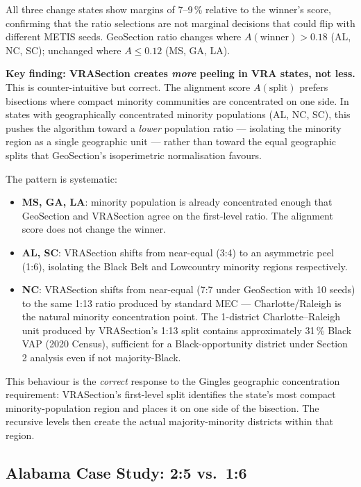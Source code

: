 All three change states show margins of 7--9\,\% relative to the winner's score,
confirming that the ratio selections are not marginal decisions that could flip
with different METIS seeds.
GeoSection ratio changes where $A(\text{winner}) > 0.18$ (AL, NC, SC);
unchanged where $A \leq 0.12$ (MS, GA, LA).

\noindent\textbf{Key finding: VRASection creates \emph{more} peeling in VRA states, not less.}
This is counter-intuitive but correct.
The alignment score $A(\mathrm{split})$ prefers bisections where compact minority
communities are concentrated on one side.
In states with geographically concentrated minority populations (AL, NC, SC),
this pushes the algorithm toward a \emph{lower} population ratio --- isolating
the minority region as a single geographic unit --- rather than toward the equal
geographic splits that GeoSection's isoperimetric normalisation favours.

The pattern is systematic:
\begin{itemize}
\item \textbf{MS, GA, LA}: minority population is already concentrated enough that
  GeoSection and VRASection agree on the first-level ratio.
  The alignment score does not change the winner.
\item \textbf{AL, SC}: VRASection shifts from near-equal (3:4) to an asymmetric peel (1:6),
  isolating the Black Belt and Lowcountry minority regions respectively.
\item \textbf{NC}: VRASection shifts from near-equal (7:7 under GeoSection with 10 seeds)
  to the same 1:13 ratio produced by standard MEC --- Charlotte/Raleigh is the
  natural minority concentration point.
  The 1-district Charlotte--Raleigh unit produced by VRASection's 1:13 split
  contains approximately 31\,\% Black VAP (2020 Census), sufficient for a
  Black-opportunity district under Section 2 analysis even if not majority-Black.
\end{itemize}

This behaviour is the \emph{correct} response to the Gingles geographic concentration
requirement: VRASection's first-level split identifies the state's most compact
minority-population region and places it on one side of the bisection.
The recursive levels then create the actual majority-minority districts within
that region.

\subsection{Alabama Case Study: 2:5 vs.\ 1:6}
\label{sec:alabama}

